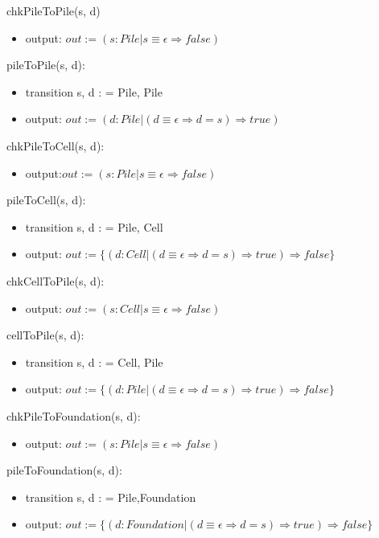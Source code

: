 \documentclass[12pt,fleqn]{article}
\begin{document}
\noindent chkPileToPile(s, d)
\begin{itemize}
\item output: $out := (s:Pile | s \equiv \epsilon \Rightarrow false)$
\end{itemize}


\noindent pileToPile(s, d):
\begin{itemize}
\item transition s, d : = Pile, Pile
\item output: $out := (d: Pile| (d \equiv \epsilon \Rightarrow d = s)\Rightarrow true)$  
\end{itemize}

\noindent chkPileToCell(s, d):
\begin{itemize}
\item output:$out := (s:Pile | s \equiv \epsilon \Rightarrow false)$
\end{itemize}

\noindent pileToCell(s, d):
\begin{itemize}
\item transition s, d : = Pile, Cell
\item output: $out := \{(d: Cell| (d \equiv \epsilon \Rightarrow d = s)\Rightarrow true) \Rightarrow false\}$

\end{itemize}

\noindent chkCellToPile(s, d):
\begin{itemize}
\item output: $out := (s:Cell | s \equiv \epsilon \Rightarrow false)$
\end{itemize}

\noindent cellToPile(s, d):
\begin{itemize}
\item transition s, d : = Cell, Pile
\item output: $out := \{(d: Pile| (d \equiv \epsilon \Rightarrow d = s)\Rightarrow true) \Rightarrow false\}$
\end{itemize}

\noindent chkPileToFoundation(s, d):
\begin{itemize}
\item output: $out := (s:Pile | s \equiv \epsilon \Rightarrow false)$
\end{itemize}


\noindent pileToFoundation(s, d):
\begin{itemize}
\item transition s, d : = Pile,Foundation
\item output: $out := \{(d: Foundation| (d \equiv \epsilon \Rightarrow d = s)\Rightarrow true) \Rightarrow false\}$
\end{itemize}
\end{document}
